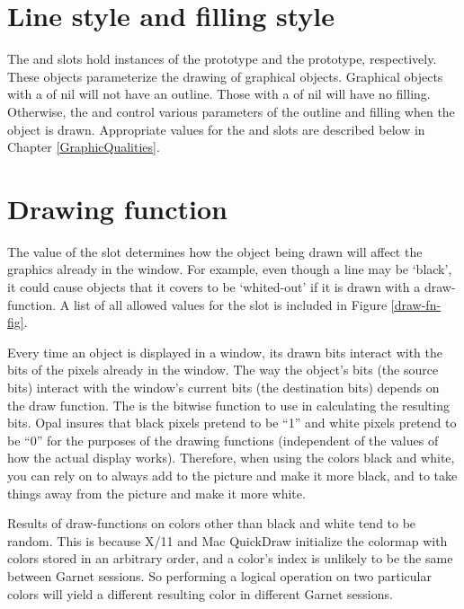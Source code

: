 \section{Line style and filling style}
The  and  slots hold instances of the
 prototype and the  prototype,
respectively.
These objects parameterize the drawing of graphical objects.  Graphical objects
with a  of {\sc nil} will not have an outline.  Those with a
 of {\sc nil} will have no filling.  Otherwise, the
 and  control various parameters of the
outline and filling when the object is drawn.
Appropriate values for the  and  slots are
described below in Chapter \ref{GraphicQualities}.

\section{Drawing function}
The value of the  slot determines how the object
being drawn will affect the graphics already in the window.  For example,
even though a line may be `black', it could cause objects that it covers
to be `whited-out' if it is drawn with a  draw-function.
A list of all allowed values for the
 slot is included in Figure \ref{draw-fn-fig}.

Every time an object is displayed in a window, its drawn bits interact with
the bits of the pixels already in the window.  The way the object's bits
(the source bits) interact with the window's current bits (the destination
bits) depends on the draw function.
The  is the bitwise function to use in calculating the
resulting bits.  Opal insures that black pixels pretend to be ``1'' and
white pixels pretend to be ``0'' for the purposes of the drawing functions
(independent of the values of how the actual display works).
Therefore, when using the colors black and white, you can rely on 
to always add to the picture and make it more black, and  to take
things away from the picture and make it more white.

Results of draw-functions on colors other than black and white tend to be
random.  This is because X/11 and Mac QuickDraw initialize the colormap with
colors stored in
an arbitrary order, and a color's index is unlikely to be the same between
Garnet sessions.  So performing a logical operation on two particular colors
will yield a different resulting color in different Garnet sessions.


